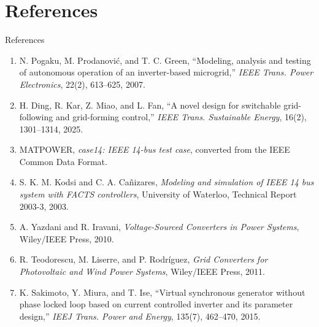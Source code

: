 \documentclass{beamer}
\begin{document}
\section{References}
\begin{frame}{References}
\footnotesize
\begin{enumerate}\setlength{\itemsep}{.04cm}
\item N. Pogaku, M. Prodanovi\'{c}, and T. C. Green, ``Modeling, analysis and testing of autonomous operation of an inverter-based microgrid,'' \emph{IEEE Trans. Power Electronics}, 22(2), 613--625, 2007.
\item H. Ding, R. Kar, Z. Miao, and L. Fan, ``A novel design for switchable grid-following and grid-forming control,'' \emph{IEEE Trans. Sustainable Energy}, 16(2), 1301--1314, 2025.
\item MATPOWER, \emph{case14: IEEE 14-bus test case}, converted from the IEEE Common Data Format.
\item S. K. M. Kodsi and C. A. Ca\~nizares, \emph{Modeling and simulation of IEEE 14 bus system with FACTS controllers}, University of Waterloo, Technical Report 2003-3, 2003.
\item A. Yazdani and R. Iravani, \emph{Voltage-Sourced Converters in Power Systems}, Wiley/IEEE Press, 2010.
\item R. Teodorescu, M. Liserre, and P. Rodr\'{i}guez, \emph{Grid Converters for Photovoltaic and Wind Power Systems}, Wiley/IEEE Press, 2011.
\item K. Sakimoto, Y. Miura, and T. Ise, ``Virtual synchronous generator without phase locked loop based on current controlled inverter and its parameter design,'' \emph{IEEJ Trans. Power and Energy}, 135(7), 462--470, 2015.
\end{enumerate}
\end{frame}
\end{document}

